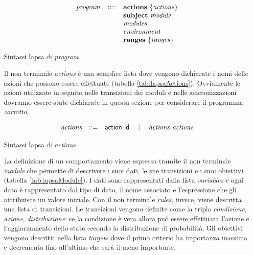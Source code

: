 \begin{table}[htbp!] %
$$
\begin{array}{rcl}
	\mathit{program} &::=& \mathbf{actions} \mbox{ } \{ \mathit{actions} \} \\
		&& \mathbf{subject} \mbox{ } \mathit{module} \\
		&& \mathit{modules} \\
		&& \mathit{environment} \\
		&& \mathbf{ranges} \mbox{ } \{ \mathit{ranges} \} \\
\end{array}
$$
\caption{Sintassi \ac{lapsa} di \emph{program}}
\label{tab:lapsaProgram}
\end{table}

Il non terminale \emph{actions} è una semplice lista dove vengono dichiarate i nomi delle azioni che possono essere effettuate (tabella \ref{tab:lapsaActions}). Ovviamente le azioni utilizzate in seguito nelle transizioni dei moduli e nelle sincronizzazioni dovranno essere state dichiarate in questa sezione per considerare il programma \emph{corretto}.

\begin{table}[htbp!] %
$$
\begin{array}{rcl}
	\mathit{actions} &::=& {\sf action}\textrm{-}{\sf id} \quad\mid\quad \mathit{actions} \mbox{ } \mathit{actions} \\
\end{array}
$$
\caption{Sintassi \ac{lapsa} di \emph{actions}}
\label{tab:lapsaActions}
\end{table}

La definizione di un comportamento viene espressa tramite il non terminale \emph{module} che permette di descrivere i suoi dati, le sue transizioni e i suoi obiettivi (tabella \ref{tab:lapsaModule}). I dati sono rappresentati dalla lista \emph{variables} e ogni dato è rappresentato dal tipo di dato, il nome associato e l'espressione che gli attribuisce un valore iniziale. Con il non terminale \emph{rules}, invece, viene descritta una lista di transizioni. Le transizioni vengono definite come la tripla \emph{condizione}, \emph{azione}, \emph{distribuzione}: se la condizione è vera allora può essere effettuata l'azione e l'aggiornamento dello stato secondo la distribuzione di probabilità. Gli obiettivi vengono descritti nella lista \emph{targets} dove il primo criterio ha importanza massima e decrementa fino all'ultimo che sarà il meno importante.

